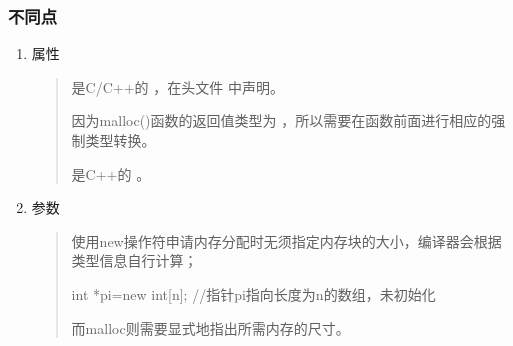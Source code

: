 \documentclass[letterpaper,10pt,english]{sphinxmanual}
\begin{document}
\subsubsection{不同点}
\label{\detokenize{cpp/02_array:id7}}\begin{enumerate}
\item {} 
属性
\begin{quote}

 是C/C++的  ，在头文件  中声明。

%
\begin{sphinxVerbatim}[commandchars=\\\{\}]
  
  
\end{sphinxVerbatim}

因为malloc()函数的返回值类型为  ，所以需要在函数前面进行相应的强制类型转换。

 是C++的  。
\end{quote}

\item {} 
参数
\begin{quote}

使用new操作符申请内存分配时无须指定内存块的大小，编译器会根据类型信息自行计算；

%
\begin{sphinxVerbatim}[commandchars=\\\{\}]
int *pi=new int[n]; //指针pi指向长度为n的数组，未初始化
\end{sphinxVerbatim}

而malloc则需要显式地指出所需内存的尺寸。

%
\begin{sphinxVerbatim}[commandchars=\\\{\}]
   
   
\end{sphinxVerbatim}


\end{quote}
\end{enumerate}
\end{document}
